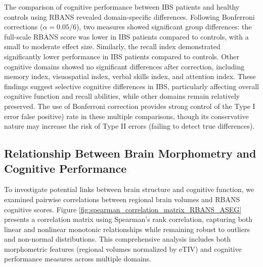 \documentclass[diagnostics,article,accept,pdftex,moreauthors]{Definitions/mdpi}
\begin{document}
The comparison of cognitive performance between IBS patients and healthy controls using RBANS revealed domain-specific differences. Following Bonferroni corrections ($\alpha = 0.05/6$), two measures showed significant group differences: the full-scale RBANS score was lower in IBS patients compared to controls, with a small to moderate effect size. Similarly, the recall index demonstrated significantly lower performance in IBS patients compared to controls. Other cognitive domains showed no significant differences after correction, including memory index, visuospatial index, verbal skills index, and attention index. These findings suggest selective cognitive differences in IBS, particularly affecting overall cognitive function and recall abilities, while other domains remain relatively preserved. The use of Bonferroni correction provides strong control of the Type I error false positive) rate in these multiple comparisons, though its conservative nature may increase the risk of Type II errors (failing to detect true differences).



\subsection{Relationship Between Brain Morphometry and Cognitive Performance}

To investigate potential links between brain structure and cognitive function, we examined pairwise correlations between regional brain volumes and RBANS cognitive scores. Figure \ref{fig:spearman_correlation_matrix_RBANS_ASEG} presents a correlation matrix using Spearman's rank correlation, capturing both linear and nonlinear monotonic relationships while remaining robust to outliers and non-normal distributions. This comprehensive analysis includes both morphometric features (regional volumes normalized by eTIV) and cognitive performance measures across multiple domains.

\vspace{-9pt}
\end{document}
